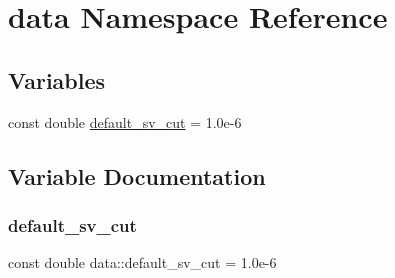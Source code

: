\hypertarget{namespacedata}{}\section{data Namespace Reference}
\label{namespacedata}
\subsection*{Variables}
\begin{DoxyCompactItemize}
\item 
const double \mbox{\hyperlink{namespacedata_abcd4a933af43e497b5b560ecdca228d8}{default\+\_\+sv\+\_\+cut}} = 1.\+0e-\/6
\end{DoxyCompactItemize}


\subsection{Variable Documentation}
\mbox{\label{namespacedata_abcd4a933af43e497b5b560ecdca228d8}} 
\subsubsection{\texorpdfstring{default\_sv\_cut}{default\_sv\_cut}}
{\footnotesize\ttfamily const double data\+::default\+\_\+sv\+\_\+cut = 1.\+0e-\/6}

